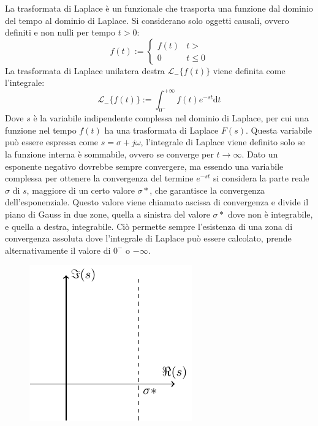 \documentclass{article}
\numberwithin{equation}{subsection}
\newcommand{\df}{\mathrm{d}}
\begin{document}
La trasformata di Laplace è un funzionale che trasporta una funzione dal dominio del tempo al dominio di Laplace. Si considerano solo oggetti 
causali, ovvero definiti e non nulli per tempo $t>0$:
\begin{equation*}
    f(t):=
    \begin{cases}
        f(t) &t>\\
        0 &t\leq0
    \end{cases}
\end{equation*}    
La trasformata di Laplace unilatera destra $\mathcal{L}_-\{f(t)\}$ viene definita come l'integrale: 
\begin{equation}
    \mathcal{L}_-\{f(t)\}:=\displaystyle\int_{0^-}^{+\infty}f(t)e^{-st}\df t
\end{equation}
Dove $s$ è la variabile indipendente complessa nel dominio di Laplace, per cui una funzione nel tempo $f(t)$ ha una trasformata di Laplace $F(s)$. 
Questa variabile può essere espressa come $s=\sigma+j\omega$, l'integrale di Laplace viene definito solo se la funzione interna è sommabile, ovvero se converge per $t\to\infty$. 
Dato un esponente negativo dovrebbe sempre convergere, ma essendo una variabile complessa per ottenere la convergenza del termine $e^{-st}$ si considera la parte reale $\sigma$
di $s$, maggiore di un certo valore $\sigma*$, che garantisce la convergenza dell'esponenziale. Questo valore viene chiamato ascissa di convergenza e divide il piano di Gauss 
in due zone, quella a sinistra del valore $\sigma*$ dove non è integrabile, e quella a destra, integrabile. Ciò permette sempre l'esistenza di una zona di convergenza assoluta dove l'integrale 
di Laplace può essere calcolato, prende alternativamente il valore di $0^-$ o $-\infty$. 
\begin{figure}[H]%
    \centering
    \includegraphics{convergenza-laplace.pdf}%
\end{figure}
\end{document}
